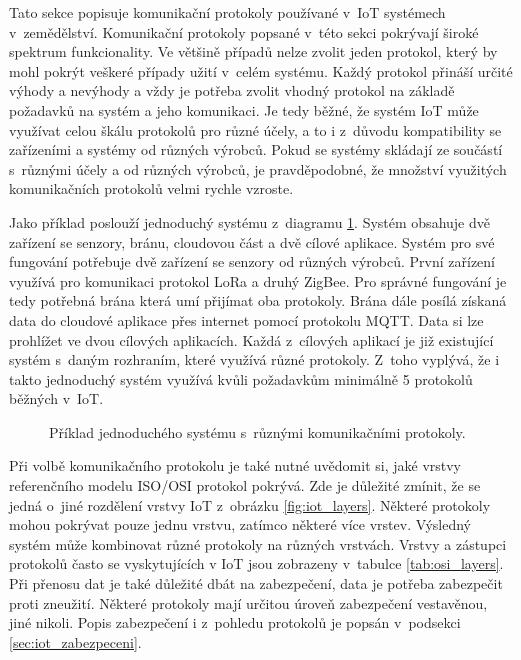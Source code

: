 \label{sec:comm_prot}
Tato sekce popisuje komunikační protokoly používané v~IoT systémech v~zemědělství. Komunikační protokoly popsané v~této sekci pokrývají široké spektrum funkcionality. Ve většině případů nelze zvolit jeden protokol, který by mohl pokrýt veškeré případy užití v~celém systému. Každý protokol přináší určité výhody a nevýhody a vždy je potřeba zvolit vhodný protokol na základě požadavků na systém a jeho komunikaci. Je tedy běžné, že systém IoT může využívat celou škálu protokolů pro různé účely, a to i z~důvodu kompatibility se zařízeními a systémy od různých výrobců. Pokud se systémy skládají ze součástí s~různými účely a od různých výrobců, je pravděpodobné, že množství využitých komunikačních protokolů velmi rychle vzroste. 

Jako příklad poslouží jednoduchý systému z~diagramu \ref{fig:protoco_system_example}. Systém obsahuje dvě zařízení se senzory, bránu, cloudovou část a dvě cílové aplikace. Systém pro své fungování potřebuje dvě zařízení se senzory od různých výrobců. První zařízení využívá pro komunikaci protokol LoRa a druhý ZigBee. Pro správné fungování je tedy potřebná brána která umí přijímat oba protokoly. Brána dále posílá získaná data do cloudové aplikace přes internet pomocí protokolu MQTT. Data si lze prohlížet ve dvou cílových aplikacích. Každá z~cílových aplikací je již existující systém s~daným rozhraním, které využívá různé protokoly. Z~toho vyplývá, že i takto jednoduchý systém využívá kvůli požadavkům minimálně 5 protokolů běžných v~IoT.

\begin{figure}[ht]
  \centering
  
  \caption{Příklad jednoduchého systému s~různými komunikačními protokoly.}
  \label{fig:protoco_system_example}
\end{figure}

Při volbě komunikačního protokolu je také nutné uvědomit si, jaké vrstvy referenčního modelu ISO/OSI protokol pokrývá. Zde je důležité zmínit, že se jedná o~jiné rozdělení vrstvy IoT z~obrázku \ref{fig:iot_layers}. Některé protokoly mohou pokrývat pouze jednu vrstvu, zatímco některé více vrstev. Výsledný systém může kombinovat různé protokoly na různých vrstvách. Vrstvy a zástupci protokolů často se vyskytujících v IoT jsou zobrazeny v~tabulce \ref{tab:osi_layers}. Při přenosu dat je také důležité dbát na zabezpečení, data je potřeba zabezpečit proti zneužití. Některé protokoly mají určitou úroveň zabezpečení vestavěnou, jiné nikoli. Popis zabezpečení i z~pohledu protokolů je popsán v~podsekci \ref{sec:iot_zabezpeceni}.

